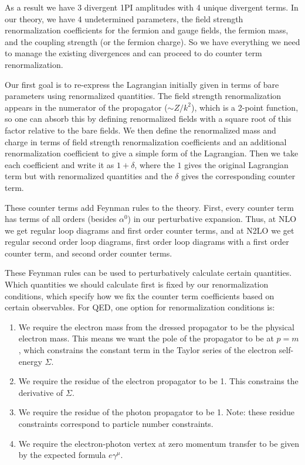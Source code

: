 \documentclass[12pt]{memoir}
\begin{document}
As a result we have 3 divergent 1PI amplitudes with 4 unique divergent terms.
In our theory, we have 4 undetermined parameters,
the field strength renormalization coefficients for the fermion and gauge fields,
the fermion mass,
and the coupling strength (or the fermion charge).
So we have everything we need to manage the existing divergences and can proceed to do counter term renormalization.

Our first goal is to re-express the Lagrangian initially given in terms of bare parameters
using renormalized quantities.
The field strength renormalization appears in the numerator of the propagator ($\sim Z/k^2$),
which is a 2-point function,
so one can absorb this by defining renormalized fields with a square root of this factor
relative to the bare fields.
We then define the renormalized mass and charge in terms of field strength renormalization coefficients
and an additional renormalization coefficient to give a simple form of the Lagrangian.
Then we take each coefficient and write it as $1 + \delta$,
where the $1$ gives the original Lagrangian term but with renormalized quantities
and the $\delta$ gives the corresponding counter term.

These counter terms add Feynman rules to the theory.
First, every counter term has terms of all orders (besides $\alpha^0$) in our perturbative expansion.
Thus, at NLO we get regular loop diagrams and first order counter terms,
and at N2LO we get regular second order loop diagrams,
first order loop diagrams with a first order counter term,
and second order counter terms.

These Feynman rules can be used to perturbatively calculate certain quantities.
Which quantities we should calculate first is fixed by our renormalization conditions,
which specify how we fix the counter term coefficients based on certain observables.
For QED, one option for renormalization conditions is:
\begin{enumerate}
  \item We require the electron mass from the dressed propagator to be the physical electron mass.
    This means we want the pole of the propagator to be at $p=m$,
    which constrains the constant term in the Taylor series of the electron self-energy $\Sigma$.
  \item We require the residue of the electron propagator to be 1.
    This constrains the derivative of $\Sigma$.
  \item We require the residue of the photon propagator to be 1.
    Note: these residue constraints correspond to particle number constraints.
  \item We require the electron-photon vertex at zero momentum transfer to be given by the expected formula
    $e \gamma^{\mu}$.
\end{enumerate}
\end{document}
